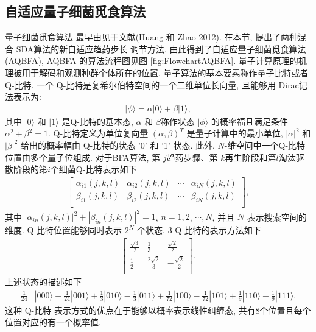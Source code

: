 \subsection{自适应量子细菌觅食算法}
量子细菌觅食算法 最早由见于文献(Huang 和 Zhao 2012). 在本节, 提出了两种混合 SDA算法的新自适应趋药步长 调节方法. 由此得到了自适应量子细菌觅食算法 (AQBFA), AQBFA 的算法流程图见图 \ref{fig:FlowchartAQBFA}.
量子计算原理的机理被用于解码和观测种群个体所在的位置. 量子算法的基本要素称作量子比特或者 Q-比特. 一个 Q-比特是复希尔伯特空间的一个二维单位长向量, 且能够用 Dirac记法表示为:
\begin{gather}
    |\phi\rangle=\alpha|0\rangle+\beta |1\rangle,
\end{gather}
其中 $|0\rangle$ 和 $|1\rangle$ 是Q-比特的基本态, $\alpha$ 和  $\beta$称作状态 $|\phi\rangle$ 的概率福且满足条件 $\alpha^2+\beta^2=1$.
Q-比特定义为单位复向量 $(\alpha,\beta)^T$ 是量子计算中的最小单位, $|\alpha|^2$ 和 $|\beta|^2$ 给出的概率幅由 Q-比特的状态 '0' 和 '1' 状态.
此外, $N$-维空间中一个Q-比特位置由多个量子位组成. 对于BFA算法, 第 $j$趋药步骤、第 $k$再生阶段和第$l$淘汰驱散阶段的第$i$个细菌Q-比特表示如下
\begin{align}
\begin{bmatrix}
    \alpha_{i1}(j,k,l) &  \alpha_{i2}(j,k,l)  &  \cdots&  \alpha_{iN}(j,k,l)\\
    \beta_{i1}(j,k,l)&  \beta_{i2}(j,k,l)&  \cdots &  \beta_{iN}(j,k,l)\\
\end{bmatrix},
\end{align}
其中 $|\alpha_{in}(j,k,l)|^2+|\beta_{in}(j,k,l)|^2=1$, $n=1, 2$, $\cdots, N$, 并且 $N$ 表示搜索空间的维度.
Q-比特位置能够同时表示 $2^N$ 个状态. 3-Q-比特的表示方法如下
\begin{align*}
\begin{bmatrix}
\frac{\sqrt{3}}{2} &  \frac{1}{3}&  \frac{\sqrt{2}}{2}\\
\frac{1}{2}&  \frac{2\sqrt{2}}{3}&  -\frac{\sqrt{2}}{2}\\
\end{bmatrix}.
\end{align*}
上述状态的描述如下
\begin{align}
  \frac{1}{24}&|0 0 0\rangle-\frac{1}{24}|0 0 1\rangle+\frac{1}{3}|0 10\rangle-\frac{1}{3}|0 11\rangle
    +\frac{1}{72}|100\rangle-\frac{1}{72}|1 01\rangle+\frac{1}{9}|1 10\rangle-\frac{1}{9}|1 11\rangle.
\end{align}
这种 Q-比特 表示方式的优点在于能够以概率表示线性纠缠态, 共有8个位置且每个位置对应的有一个概率值.

